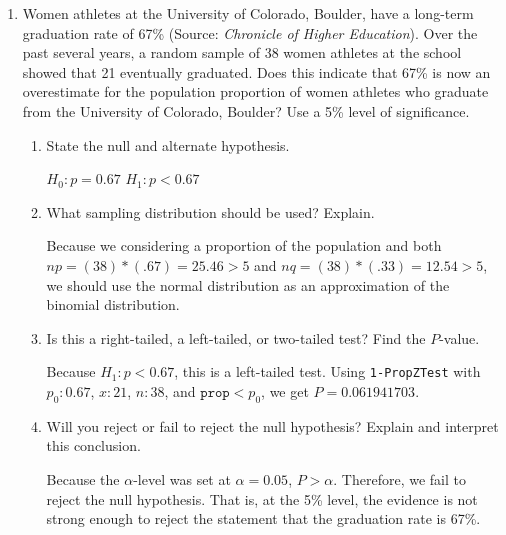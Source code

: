 \documentclass{article}
\newcommand{\answer}[1]{\color{red}#1}
\begin{document}
\pagestyle{myheadings}

\begin{center}
\textbf{}
\end{center}


\begin{enumerate}

\item Women athletes at the University of Colorado, Boulder, have a long-term graduation rate of 67\% (Source: {\em Chronicle of Higher Education}). Over the past several years, a random sample of 38 women athletes at the school showed that 21 eventually graduated. Does this indicate that 67\% is now an overestimate for the population proportion of women athletes who graduate from the University of Colorado, Boulder? Use a 5\% level of significance.
	\begin{enumerate}
	\item State the null and alternate hypothesis. 
	
	{\answer $H_0 : p = 0.67$ 
	$H_1: p < 0.67$} 
		
	\item What sampling distribution should be used? Explain. 
	
	{\answer Because we considering a proportion of the population and both $np = (38)*(.67) = 25.46 >5$ and $nq = (38)*(.33) = 12.54 >5$, we should use the normal distribution as an approximation of the binomial distribution.} 
	
	\item Is this a right-tailed, a left-tailed, or two-tailed test? Find the $P$-value. 
	
	{\answer Because $H_1: p < 0.67$, this is a left-tailed test. 
	Using \texttt{1-PropZTest} with $p_0: 0.67$, $x: 21$, $n:38$, and $\texttt{prop} < p_0$, we get $P = 0.061941703$.} 
	 
	\item Will you reject or fail to reject the null hypothesis? Explain and interpret this conclusion. 
	
	{\answer Because the $\alpha$-level was set at $\alpha = 0.05$, $P > \alpha$. Therefore, we fail to reject the null hypothesis. That is, at the 5\% level, the evidence is not strong enough to reject the statement that the graduation rate is 67\%.} 
	\end{enumerate}


\end{enumerate}
\end{document}
